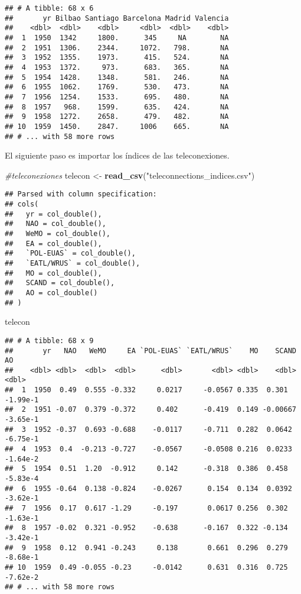 \documentclass[]{article}
\newenvironment{Shaded}{\begin{snugshade}}{\end{snugshade}}
\newcommand{\KeywordTok}[1]{\textcolor[rgb]{0.13,0.29,0.53}{\textbf{#1}}}
\newcommand{\StringTok}[1]{\textcolor[rgb]{0.31,0.60,0.02}{#1}}
\newcommand{\CommentTok}[1]{\textcolor[rgb]{0.56,0.35,0.01}{\textit{#1}}}
\newcommand{\NormalTok}[1]{#1}
\begin{document}
\begin{verbatim}
## # A tibble: 68 x 6
##       yr Bilbao Santiago Barcelona Madrid Valencia
##    <dbl>  <dbl>    <dbl>     <dbl>  <dbl>    <dbl>
##  1  1950  1342     1800.      345     NA        NA
##  2  1951  1306.    2344.     1072.   798.       NA
##  3  1952  1355.    1973.      415.   524.       NA
##  4  1953  1372.     973.      683.   365.       NA
##  5  1954  1428.    1348.      581.   246.       NA
##  6  1955  1062.    1769.      530.   473.       NA
##  7  1956  1254.    1533.      695.   480.       NA
##  8  1957   968.    1599.      635.   424.       NA
##  9  1958  1272.    2658.      479.   482.       NA
## 10  1959  1450.    2847.     1006    665.       NA
## # ... with 58 more rows
\end{verbatim}

El siguiente paso es importar los índices de las teleconexiones.

\begin{Shaded}
\begin{Highlighting}[]
\CommentTok{#teleconexiones}
\NormalTok{telecon <-}\StringTok{ }\KeywordTok{read_csv}\NormalTok{(}\StringTok{"teleconnections_indices.csv"}\NormalTok{)}
\end{Highlighting}
\end{Shaded}

\begin{verbatim}
## Parsed with column specification:
## cols(
##   yr = col_double(),
##   NAO = col_double(),
##   WeMO = col_double(),
##   EA = col_double(),
##   `POL-EUAS` = col_double(),
##   `EATL/WRUS` = col_double(),
##   MO = col_double(),
##   SCAND = col_double(),
##   AO = col_double()
## )
\end{verbatim}

\begin{Shaded}
\begin{Highlighting}[]
\NormalTok{telecon}
\end{Highlighting}
\end{Shaded}

\begin{verbatim}
## # A tibble: 68 x 9
##       yr   NAO   WeMO     EA `POL-EUAS` `EATL/WRUS`    MO    SCAND       AO
##    <dbl> <dbl>  <dbl>  <dbl>      <dbl>       <dbl> <dbl>    <dbl>    <dbl>
##  1  1950  0.49  0.555 -0.332     0.0217     -0.0567 0.335  0.301   -1.99e-1
##  2  1951 -0.07  0.379 -0.372     0.402      -0.419  0.149 -0.00667 -3.65e-1
##  3  1952 -0.37  0.693 -0.688    -0.0117     -0.711  0.282  0.0642  -6.75e-1
##  4  1953  0.4  -0.213 -0.727    -0.0567     -0.0508 0.216  0.0233  -1.64e-2
##  5  1954  0.51  1.20  -0.912     0.142      -0.318  0.386  0.458   -5.83e-4
##  6  1955 -0.64  0.138 -0.824    -0.0267      0.154  0.134  0.0392  -3.62e-1
##  7  1956  0.17  0.617 -1.29     -0.197       0.0617 0.256  0.302   -1.63e-1
##  8  1957 -0.02  0.321 -0.952    -0.638      -0.167  0.322 -0.134   -3.42e-1
##  9  1958  0.12  0.941 -0.243     0.138       0.661  0.296  0.279   -8.68e-1
## 10  1959  0.49 -0.055 -0.23     -0.0142      0.631  0.316  0.725   -7.62e-2
## # ... with 58 more rows
\end{verbatim}
\end{document}
